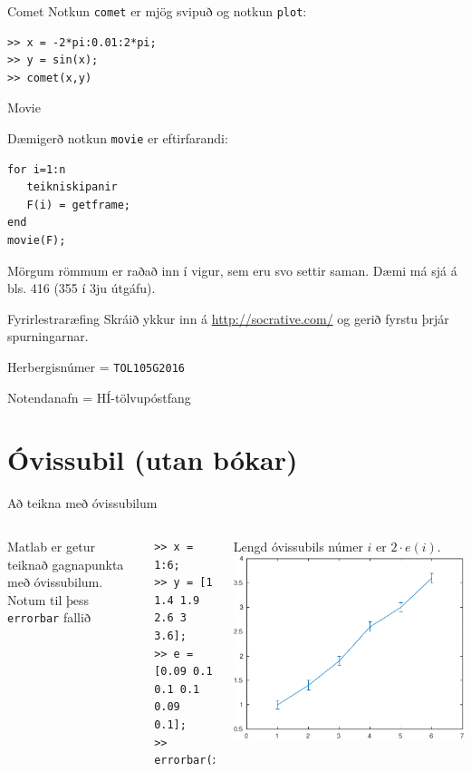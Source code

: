 \documentclass{beamer}
\begin{document}
\begin{frame}[fragile]{Comet}
Notkun \texttt{comet} er mjög svipuð og notkun \texttt{plot}:
\begin{verbatim}
>> x = -2*pi:0.01:2*pi;
>> y = sin(x);
>> comet(x,y)
\end{verbatim}
\end{frame}

\begin{frame}[fragile]{Movie}

Dæmigerð notkun \texttt{movie} er eftirfarandi:
\begin{verbatim}
for i=1:n
   teikniskipanir
   F(i) = getframe;
end
movie(F);
\end{verbatim}
Mörgum römmum er raðað inn í vigur, sem eru svo settir saman. Dæmi má sjá á bls. 416 (355 í 3ju útgáfu).

\end{frame}

\begin{frame}[fragile]{Fyrirlestraræfing}
Skráið ykkur inn á \url{http://socrative.com/} og gerið fyrstu þrjár spurningarnar.

Herbergisnúmer = \texttt{TOL105G2016}

Notendanafn = HÍ-tölvupóstfang
\end{frame}

\section{Óvissubil (utan bókar)}

\begin{frame}[fragile]{Að teikna með óvissubilum}
\begin{columns}
Matlab er getur teiknað gagnapunkta með óvissubilum. Notum til þess \texttt{errorbar} fallið
\begin{verbatim}
>> x = 1:6;
>> y = [1 1.4 1.9 2.6 3 3.6];
>> e = [0.09 0.1 0.1 0.1 0.09 0.1];
>> errorbar(x,y,e)
\end{verbatim}
Lengd óvissubils númer $i$ er $2\cdot e(i)$.
\includegraphics[width=\textwidth]{../Pics/simple-errorbar}
\end{columns}
\end{frame}
\end{document}
